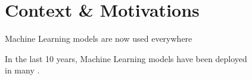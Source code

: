 \section{Context \& Motivations}


\begin{frame}{Machine Learning models are now used everywhere}

  \begin{minipage}{\textwidth}
    \centering
    In the last 10 years, Machine Learning models have been deployed \\ in many .
  \end{minipage}

  \vspace{0.5cm}


\end{frame}
